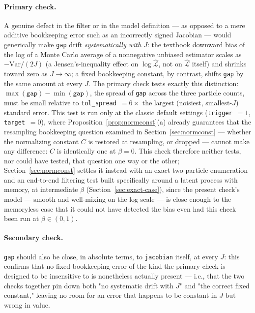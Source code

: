 \documentclass[11pt]{article}
\newcommand{\Var}{\mathrm{Var}}
\begin{document}
\paragraph{Primary check.} A genuine defect in the filter or in the model
definition — as opposed to a mere additive bookkeeping error such as an
incorrectly signed Jacobian — would generically make \texttt{gap} drift
\emph{systematically with $J$}: the textbook downward bias of the log of a
Monte Carlo average of a nonnegative unbiased estimator scales as
$-\Var/(2J)$ (a Jensen's-inequality effect on $\log\widehat{\mathcal L}$, not
on $\widehat{\mathcal L}$ itself) and shrinks toward zero as $J\to\infty$; a
fixed bookkeeping constant, by contrast, shifts \texttt{gap} by the same
amount at every $J$. The primary check tests exactly this distinction:
$\max(\texttt{gap})-\min(\texttt{gap})$, the spread of \texttt{gap} across
the three particle counts, must be small relative to
\texttt{tol\_spread}~$=6\times$ the largest (noisiest, smallest-$J$) standard
error. This test is run only at the classic default settings
(\texttt{trigger}~$=1$, \texttt{target}~$=0$), where
Proposition~\ref{prop:normconst}(a) already guarantees that the resampling
bookkeeping question examined in Section~\ref{sec:normconst} — whether the
normalizing constant $C$ is restored at resampling, or dropped — cannot
make any difference: $C$ is identically one at $\beta=0$. This check
therefore neither tests, nor could have tested, that question one way or
the other; Section~\ref{sec:normconst} settles it instead with an exact
two-particle enumeration and an end-to-end filtering test built specifically
around a latent process with memory, at intermediate $\beta$
(Section~\ref{sec:exact-case}), since the present check's model —
smooth and well-mixing on the log scale — is close enough to the memoryless
case that it could not have detected the bias even had this check been run
at $\beta\in(0,1)$.

\paragraph{Secondary check.} \texttt{gap} should also be close, in absolute
terms, to \texttt{jacobian} itself, at every $J$: this confirms that no fixed
bookkeeping error of the kind the primary check is designed to be
insensitive to is nonetheless actually present — i.e., that the two checks
together pin down both "no systematic drift with $J$" and "the correct fixed
constant," leaving no room for an error that happens to be constant in $J$
but wrong in value.
\end{document}

